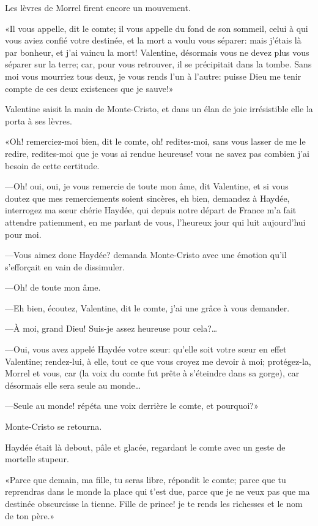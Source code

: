 Les lèvres de Morrel firent encore un mouvement. 

«Il vous appelle, dit le comte; il vous appelle du fond de son sommeil, celui à qui vous aviez confié votre destinée, et la mort a voulu vous séparer: mais j'étais là par bonheur, et j'ai vaincu la mort! Valentine, désormais vous ne devez plus vous séparer sur la terre; car, pour vous retrouver, il se précipitait dans la tombe. Sans moi vous mourriez tous deux, je vous rends l'un à l'autre: puisse Dieu me tenir compte de ces deux existences que je sauve!» 

Valentine saisit la main de Monte-Cristo, et dans un élan de joie irrésistible elle la porta à ses lèvres. 

«Oh! remerciez-moi bien, dit le comte, oh! redites-moi, sans vous lasser de me le redire, redites-moi que je vous ai rendue heureuse! vous ne savez pas combien j'ai besoin de cette certitude. 

—Oh! oui, oui, je vous remercie de toute mon âme, dit Valentine, et si vous doutez que mes remerciements soient sincères, eh bien, demandez à Haydée, interrogez ma sœur chérie Haydée, qui depuis notre départ de France m'a fait attendre patiemment, en me parlant de vous, l'heureux jour qui luit aujourd'hui pour moi. 

—Vous aimez donc Haydée? demanda Monte-Cristo avec une émotion qu'il s'efforçait en vain de dissimuler. 

—Oh! de toute mon âme. 

—Eh bien, écoutez, Valentine, dit le comte, j'ai une grâce à vous demander. 

—À moi, grand Dieu! Suis-je assez heureuse pour cela?\dots 

—Oui, vous avez appelé Haydée votre sœur: qu'elle soit votre sœur en effet Valentine; rendez-lui, à elle, tout ce que vous croyez me devoir à moi; protégez-la, Morrel et vous, car (la voix du comte fut prête à s'éteindre dans sa gorge), car désormais elle sera seule au monde\dots 

—Seule au monde! répéta une voix derrière le comte, et pourquoi?» 

Monte-Cristo se retourna. 

Haydée était là debout, pâle et glacée, regardant le comte avec un geste de mortelle stupeur. 

«Parce que demain, ma fille, tu seras libre, répondit le comte; parce que tu reprendras dans le monde la place qui t'est due, parce que je ne veux pas que ma destinée obscurcisse la tienne. Fille de prince! je te rends les richesses et le nom de ton père.» 

